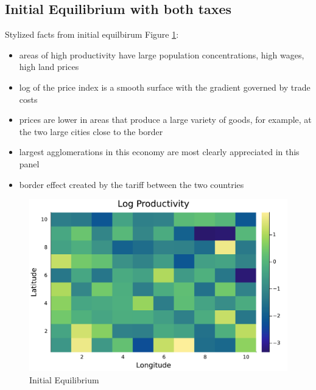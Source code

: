 \documentclass[11pt]{article}
\begin{document}
\subsection*{Initial Equilibrium with both taxes}
Stylized facts from initial equilbirum Figure \ref{initial_equi}:
\begin{itemize}
\item areas of high productivity have large population concentrations, high wages, high land prices
\item log of the price index is a smooth surface with the gradient governed by trade costs
\item prices are lower in areas that produce a large variety of goods, for example, at the two large cities close to the border
\item largest agglomerations in this economy are most clearly appreciated in this panel
\item border effect created by the tariff between the two countries
\end{itemize}

\begin{figure}[H]
\centering
\caption{Initial Equilibrium}
\label{initial_equi}
\includegraphics[scale=0.5]{../graph/H_cnty_initial_prod.pdf}
\end{figure}
\end{document}
